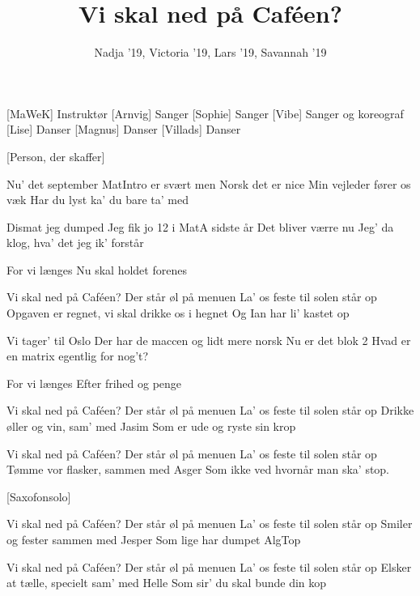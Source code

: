 \documentclass[a4paper,11pt]{article}
\title{Vi skal ned på Caféen?}
\author{Nadja '19, Victoria '19, Lars '19, Savannah '19}
\begin{document}
\maketitle

\begin{roles}
[MaWeK] Instruktør
[Arnvig] Sanger
[Sophie] Sanger
[Vibe] Sanger og koreograf
[Lise] Danser
[Magnus] Danser
[Villads] Danser
\end{roles}

\begin{props}
[Person, der skaffer]
\end{props}


\begin{song}
%
Nu' det september
MatIntro er svært men Norsk det er nice
Min vejleder fører os væk
Har du lyst ka' du bare ta' med

%
Dismat jeg dumped
Jeg fik jo 12 i MatA sidste år
Det bliver værre nu
Jeg' da klog, hva' det jeg ik' forstår

%
For vi længes
Nu skal holdet forenes

%
Vi skal ned på Caféen? Der står øl på menuen
La' os feste til solen står op
Opgaven er regnet, vi skal drikke os i hegnet
Og Ian har li' kastet op

%
Vi tager' til Oslo
Der har de maccen og lidt mere norsk
Nu er det blok 2
Hvad er en matrix egentlig for nog't?

%
For vi længes
Efter frihed og penge

%
Vi skal ned på Caféen? Der står øl på menuen
La' os feste til solen står op
Drikke øller og vin, sam' med Jasim
Som er ude og ryste sin krop

Vi skal ned på Caféen? Der står øl på menuen
La' os feste til solen står op
Tømme vor flasker, sammen med Asger
Som ikke ved hvornår man ska' stop.

[Saxofonsolo]

%
Vi skal ned på Caféen? Der står øl på menuen
La' os feste til solen står op
Smiler og fester sammen med Jesper
Som lige har dumpet AlgTop

Vi skal ned på Caféen? Der står øl på menuen
La' os feste til solen står op
Elsker at tælle, specielt sam' med Helle
Som sir' du skal bunde din kop
\end{song}
\end{document}
